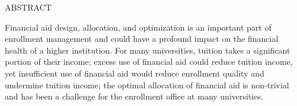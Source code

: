 \documentclass[12pt,english]{report}
\begin{document}

%
\newpage
\setcounter{page}{3}
\vspace{2in}
%
\begin{singlespace}
\begin{center}
  ABSTRACT
\end{center}

\end{singlespace}
\vspace*{.5in}	
Financial aid design, allocation, and optimization is an important part of enrollment management and could have a profound impact on the financial health of a higher institution. For many universities, tuition takes a significant portion of their income; excess use of financial aid could reduce tuition income, yet insufficient use of financial aid would reduce enrollment quality and undermine tuition income; the optimal allocation of financial aid is non-trivial and has been a challenge for the enrollment office at many universities.
\end{document}

